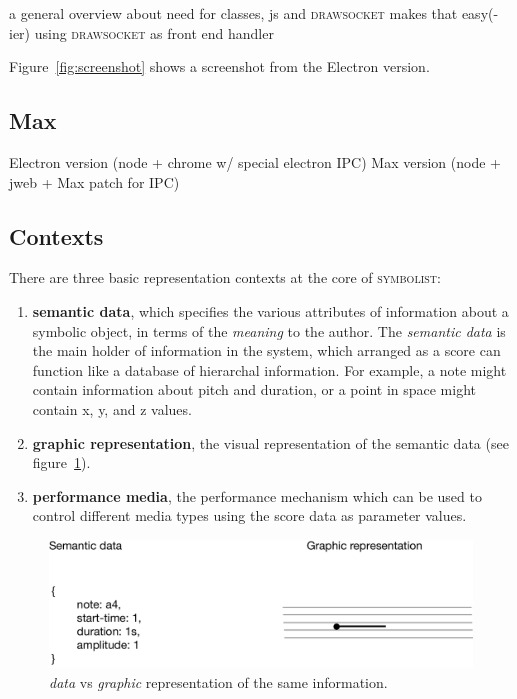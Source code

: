 \documentclass{article}
\def\symbolist{\textsc{symbolist}\xspace}
\def\drawsocket{\textsc{drawsocket}\xspace}
\begin{document}
a general overview about need for classes, js and \drawsocket makes that easy(-ier)
using \drawsocket as front end handler

Figure~\ref{fig:screenshot} shows a screenshot from the Electron version.



\subsection{Max}\label{sec:Max}

Electron version (node + chrome w/ special electron IPC)
Max version (node + jweb + Max patch for IPC)

\subsection{Contexts}\label{subsec:contexts}

There are three basic representation contexts at the core of \symbolist:

\begin{enumerate}\itemsep0pt
\item \textbf{semantic data}, which specifies the various attributes of information about a symbolic object, in terms of the \textit{meaning} to the author. The  \textit{semantic data} is the main holder of information in the system, which arranged as a score can function like a database of hierarchal information. For example, a note might contain information about pitch and duration, or a point in space might contain x, y, and z values.
\item \textbf{graphic representation}, the visual representation of the semantic data (see figure~\ref{fig:graphic-representation}).
\item \textbf{performance media}, the performance mechanism which can be used to control different media types using the score data as parameter values. 
\end{enumerate}



\begin{figure}[ht!]
\includegraphics[width=1\columnwidth]{graphic-representation.pdf}
\caption{\textit{data} vs \textit{graphic} representation of the same information.
\label{fig:graphic-representation}}
\end{figure}
\end{document}
